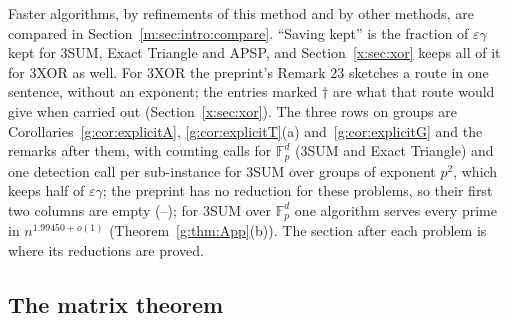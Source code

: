 \documentclass[11pt]{article}
\theoremstyle{definition}
\theoremstyle{remark}
\newcommand{\Fp}{\mathbb{F}_p}
\begin{document}
\begin{table}[t]
{Faster algorithms, by refinements of this method and by other methods, are compared in Section~\ref{m:sec:intro:compare}. ``Saving kept'' is the fraction of $\varepsilon\gamma$ kept for 3SUM, Exact Triangle and APSP, and Section~\ref{x:sec:xor} keeps all of it for 3XOR as well. For 3XOR the preprint's Remark 23 sketches a route in one sentence, without an exponent; the entries marked $\dagger$ are what that route would give when carried out (Section~\ref{x:sec:xor}). The three rows on groups are Corollaries~\ref{g:cor:explicitA}, \ref{g:cor:explicitT}(a) and~\ref{g:cor:explicitG} and the remarks after them, with counting calls for $\Fp^d$ (3SUM and Exact Triangle) and one detection call per sub-instance for 3SUM over groups of exponent $p^2$, which keeps half of $\varepsilon\gamma$; the preprint has no reduction for these problems, so their first two columns are empty (--); for 3SUM over $\Fp^d$ one algorithm serves every prime in $n^{1.99450+o(1)}$ (Theorem~\ref{g:thm:App}(b)). The section after each problem is where its reductions are proved.}
\label{tab:summary}
\end{table}

\subsection{The matrix theorem}\label{m:sec:intro:matrix}
\end{document}
